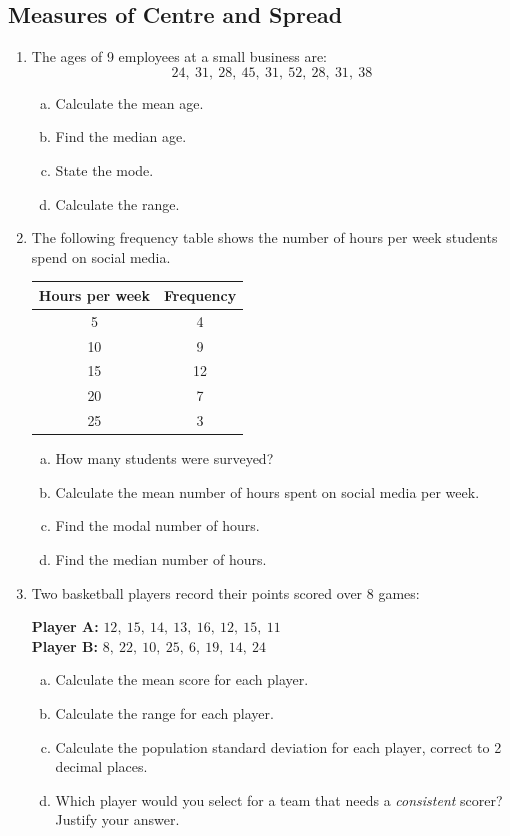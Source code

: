 \documentclass{article}
\begin{document}
\subsection{Measures of Centre and Spread}
\begin{enumerate}

  \item The ages of 9 employees at a small business are:
  \[
    24,\ 31,\ 28,\ 45,\ 31,\ 52,\ 28,\ 31,\ 38
  \]
  \begin{enumerate}[(a)]
    \item Calculate the mean age.
    \item Find the median age.
    \item State the mode.
    \item Calculate the range.
  \end{enumerate}

  \item The following frequency table shows the number of hours per week students spend on social media.
  \begin{center}
    \begin{tabular}{cc}
      \toprule
      \textbf{Hours per week} & \textbf{Frequency} \\
      \midrule
      5  & 4  \\
      10 & 9  \\
      15 & 12 \\
      20 & 7  \\
      25 & 3  \\
      \bottomrule
    \end{tabular}
  \end{center}
  \begin{enumerate}[(a)]
    \item How many students were surveyed?
    \item Calculate the mean number of hours spent on social media per week.
    \item Find the modal number of hours.
    \item Find the median number of hours.
  \end{enumerate}

  \item Two basketball players record their points scored over 8 games:
  \begin{center}
    \textbf{Player A:} $12,\ 15,\ 14,\ 13,\ 16,\ 12,\ 15,\ 11$ \\[4pt]
    \textbf{Player B:} $8,\ 22,\ 10,\ 25,\ 6,\ 19,\ 14,\ 24$
  \end{center}
  \begin{enumerate}[(a)]
    \item Calculate the mean score for each player.
    \item Calculate the range for each player.
    \item Calculate the population standard deviation for each player, correct to 2 decimal places.
    \item Which player would you select for a team that needs a \textit{consistent} scorer? Justify your answer.
  \end{enumerate}


\end{enumerate}
\end{document}
